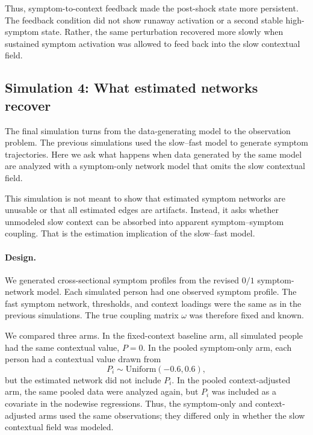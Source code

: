 Thus, symptom-to-context feedback made the post-shock state more persistent.
The feedback condition did not show runaway activation or a second stable
high-symptom state. Rather, the same perturbation recovered more slowly when
sustained symptom activation was allowed to feed back into the slow contextual
field.




\subsection{Simulation 4: What estimated networks recover}

The final simulation turns from the data-generating model to the observation
problem. The previous simulations used the slow--fast model to generate symptom
trajectories. Here we ask what happens when data generated by the same model
are analyzed with a symptom-only network model that omits the slow contextual
field.

This simulation is not meant to show that estimated symptom networks are
unusable or that all estimated edges are artifacts. Instead, it asks whether
unmodeled slow context can be absorbed into apparent symptom--symptom coupling.
That is the estimation implication of the slow--fast model.

\paragraph{Design.}
We generated cross-sectional symptom profiles from the revised \(0/1\)
symptom-network model. Each simulated person had one observed symptom profile.
The fast symptom network, thresholds, and context loadings were the same as in
the previous simulations. The true coupling matrix \(\omega\) was therefore
fixed and known.

We compared three arms. In the fixed-context baseline arm, all simulated people
had the same contextual value, \(P=0\). In the pooled symptom-only arm, each
person had a contextual value drawn from
\[
P_i \sim \mathrm{Uniform}(-0.6,0.6),
\]
but the estimated network did not include \(P_i\). In the pooled
context-adjusted arm, the same pooled data were analyzed again, but \(P_i\) was
included as a covariate in the nodewise regressions. Thus, the symptom-only and
context-adjusted arms used the same observations; they differed only in whether
the slow contextual field was modeled.

